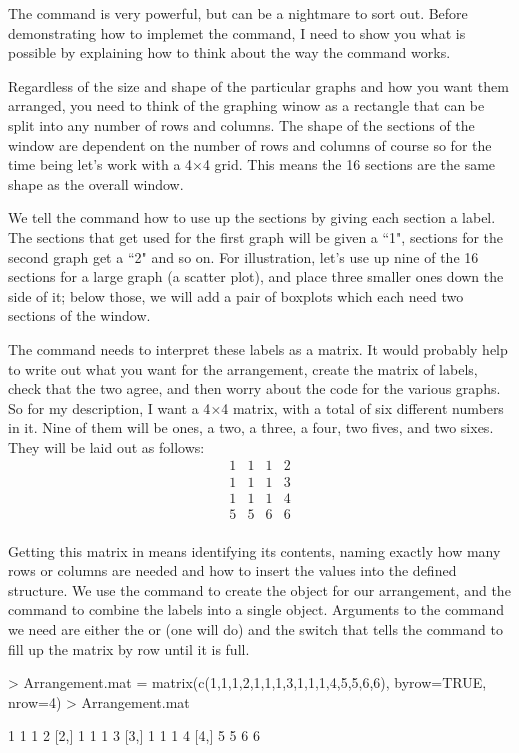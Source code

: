 The  command is very powerful, but can be a nightmare to sort out. Before demonstrating how to implemet the command, I need to show you what is possible by explaining how to think about the way the command works. 
 
Regardless of the size and shape of the particular graphs and how you want them arranged, you need to think of the graphing winow as a rectangle that can be split into any number of rows and columns. The shape of the sections of the window are dependent on the number of rows and columns of course so for the time being let's work with a 4$\times$4 grid. This means the 16 sections are the same shape as the overall window. 
 
We tell the  command how to use up the sections by giving each section a label. The sections that get used for the first graph will be given a ``1", sections for the second graph get a ``2" and so on. For illustration, let's use up nine of the 16 sections for a large graph (a scatter plot), and place three smaller ones down the side of it; below those, we will add a pair of boxplots which each need two sections of the window. 
 
The  command needs to interpret these labels as a matrix. It would probably help to write out what you want for the arrangement, create the matrix of labels, check that the two agree, and then worry about the code for the various graphs. So for my description, I want a 4$\times$4 matrix, with a total of six different numbers in it. Nine of them will be ones, a two, a three, a four, two fives, and two sixes. They will be laid out as follows: 
$$\begin{array}{cccc} 1&1&1&2\\ 1&1&1&3\\ 1&1&1&4\\ 5&5&6&6\\ \end{array}$$ 
 
Getting this matrix in \R{} means identifying its contents, naming exactly how many rows or columns are needed and how to insert the values into the defined structure. We use the  command to create the object for our arrangement, and the  command to combine the labels into a single object. Arguments to the  command we need are either the  or  (one will do) and the  switch that tells the  command to fill up the matrix by row until it is full. 
\begin{Schunk}
\begin{Sinput}
> Arrangement.mat = matrix(c(1,1,1,2,1,1,1,3,1,1,1,4,5,5,6,6), byrow=TRUE, nrow=4) 
> Arrangement.mat 
\end{Sinput}
\begin{Soutput}
     [,1] [,2] [,3] [,4]
[1,]    1    1    1    2
[2,]    1    1    1    3
[3,]    1    1    1    4
[4,]    5    5    6    6
\end{Soutput}
\end{Schunk}
 
